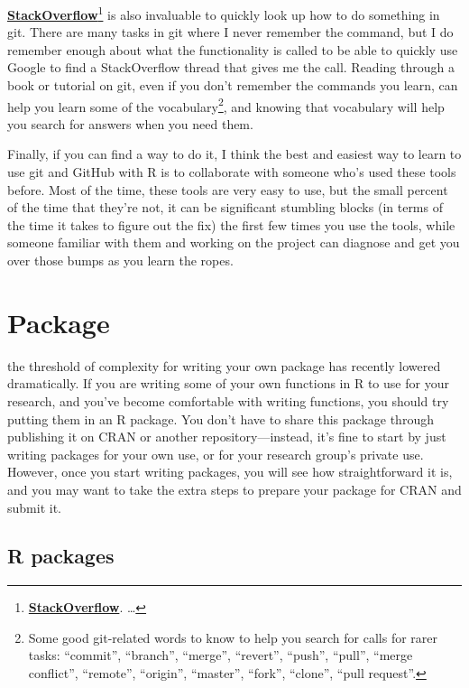\documentclass[]{tufte-book}
\begin{document}
\href{https://stackoverflow.com/}{\textbf{StackOverflow}}\footnote{\href{https://stackoverflow.com/}{\textbf{StackOverflow}}.
  \ldots{}}
is also invaluable to quickly look up how to do something in git. There are
many tasks in git where I never remember the command, but I do remember enough about what
the functionality is called to be able to quickly use Google to find a StackOverflow thread
that gives me the call. Reading through a book or tutorial on git, even if you don't
remember the commands you learn, can help you learn some of the vocabulary\footnote{Some good git-related
  words to know to help you search for calls for rarer tasks: ``commit'', ``branch'', ``merge'', ``revert'',
  ``push'', ``pull'', ``merge conflict'', ``remote'', ``origin'', ``master'', ``fork'', ``clone'', ``pull request''.},
and knowing that vocabulary will help you search for answers when you need them.

Finally, if you can find a way to do it, I think the best and easiest way to learn to use git
and GitHub with R is to collaborate with someone who's used these tools before. Most of the
time, these tools are very easy to use, but the small percent of the time that they're not,
it can be significant stumbling blocks (in terms of the time it takes to figure out the fix)
the first few times you use the tools, while someone familiar with them and working on the
project can diagnose and get you over those bumps as you learn the ropes.

\hypertarget{package}{%
\chapter{Package}\label{package}}

 the threshold of complexity
for writing your own package has recently lowered dramatically. If you are writing
some of your own functions in R to use for your research, and you've become comfortable
with writing functions, you should try putting them in an R package. You don't have
to share this package through publishing it on CRAN or another repository---instead, it's
fine to start by just writing packages for your own use, or for your research group's
private use. However, once you start writing packages, you will see how straightforward
it is, and you may want to take the extra steps to prepare your package for CRAN and
submit it.

\hypertarget{r-packages}{%
\section{R packages}\label{r-packages}}
\end{document}
